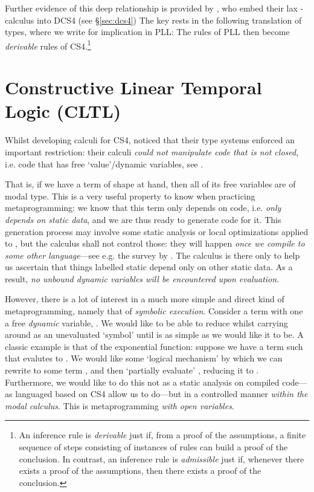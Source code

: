 \documentclass[a4paper]{amsart}
\begin{document}
Further evidence of this deep relationship is provided by
\cite{Davies2001}, who embed their lax -calculus into
\textsf{DCS4} (see \S \ref{sec:dcs4}) The key rests in the
following translation of types, where we write  for
implication in \textsf{PLL}:  The rules of \textsf{PLL} then become \emph{derivable}
rules of \textsf{CS4}.\footnote{An inference rule is
\emph{derivable} just if, from a proof of the assumptions, a
finite sequence of steps consisting of instances of rules can build a
proof of the conclusion. In contrast, an inference rule is
\emph{admissible} just if, whenever there exists a proof of the
assumptions, then there exists a proof of the conclusion.}

\section{Constructive Linear Temporal Logic (\textsf{CLTL})}
  \label{sec:cltl}

Whilst developing calculi for \textsf{CS4}, \cite{Davies1996,
Davies1999, Davies2001a} noticed that their type systems enforced
an important restriction: their calculi \emph{could not manipulate
code that is not closed}, i.e. code that has free `value'/dynamic
variables, see \cite[\S 8]{Davies2001a}.

That is, if we have a term of shape  at hand, then all
of its free variables are of modal type. This is a very useful
property to know when practicing metaprogramming: we know that
this term only depends on code, i.e. \emph{only depends on static
data}, and we are thus ready to generate code for it. This
generation process may involve some static analysis or local
optimizations applied to , but the calculus shall not control
those: they will happen \emph{once we compile to some other
language}---see e.g. the survey by \cite{Wickline1998}. The
calculus is there only to help us ascertain that things labelled
static depend only on other static data. As a result, \emph{no
unbound dynamic variables will be encountered upon evaluation}.

However, there is a lot of interest in a much more simple and
direct kind of metaprogramming, namely that of \emph{symbolic
execution}. Consider a term  with one a free \emph{dynamic}
variable, . We would like to be able to reduce  whilst
carrying  around as an unevaluated `symbol' until  is
as simple as we would like it to be. A classic example is that of
the exponential function: suppose we have a term  such that
 evalutes to . We would like some `logical
mechanism' by which we can rewrite  to some term ,
and then `partially evaluate' , reducing it to . Furthermore, we would like to do this not as a static
analysis on compiled code---as languaged based on \textsf{CS4}
allow us to do---but in a controlled manner \emph{within the modal
calculus}. This is metaprogramming \emph{with open variables}.
\end{document}
